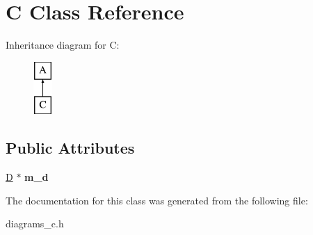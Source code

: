 \hypertarget{classC}{\section{C Class Reference}
\label{classC}
}
Inheritance diagram for C\-:\begin{figure}[H]
\begin{center}
\leavevmode
\includegraphics[height=2.000000cm]{classC}
\end{center}
\end{figure}
\subsection*{Public Attributes}
\begin{DoxyCompactItemize}
\item 
\hypertarget{classC_a4ef972d28b73ff78eba3ab4f54c3b449}{\hyperlink{classD}{D} $\ast$ {\bfseries m\-\_\-d}}\label{classC_a4ef972d28b73ff78eba3ab4f54c3b449}

\end{DoxyCompactItemize}


The documentation for this class was generated from the following file\-:\begin{DoxyCompactItemize}
\item 
diagrams\-\_\-c.\-h\end{DoxyCompactItemize}
